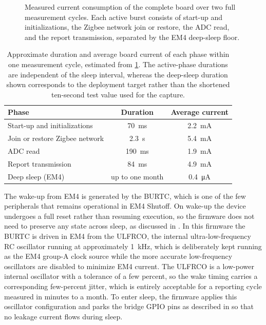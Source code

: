 \begin{figure}
    \centering
    
    \caption{Measured current consumption of the complete board over two full measurement cycles. Each active burst consists of start-up and initializations, the Zigbee network join or restore, the ADC read, and the report transmission, separated by the EM4 deep-sleep floor.}
    \label{fig:Current_2_cycles}
\end{figure}

\begin{table}
\centering
\caption{Approximate duration and average board current of each phase within one measurement cycle, estimated from \cref{fig:Current_2_cycles}. The active-phase durations are independent of the sleep interval, whereas the deep-sleep duration shown corresponds to the deployment target rather than the shortened ten-second test value used for the capture.}
\label{tab:cycle_current}
\begin{tabular}{lcc}
\hline
Phase & Duration & Average current \\
\hline
Start-up and initializations & \SI{70}{\milli\second} & \SI{2.2}{\milli\ampere} \\
Join or restore Zigbee network & \SI{2.3}{\second} & \SI{5.4}{\milli\ampere} \\
ADC read & \SI{190}{\milli\second} & \SI{1.9}{\milli\ampere} \\
Report transmission & \SI{84}{\milli\second} & \SI{4.9}{\milli\ampere} \\
Deep sleep (EM4) & up to one month & \SI{0.4}{\micro\ampere} \\
\hline
\end{tabular}
\end{table}

The wake-up from EM4 is generated by the BURTC, which is one of the few peripherals that remains operational in EM4 Shutoff.
On wake-up the device undergoes a full reset rather than resuming execution, so the firmware does not need to preserve any state across sleep, as discussed in .
In this firmware the BURTC is driven in EM4 from the ULFRCO, the internal ultra-low-frequency RC oscillator running at approximately \SI{1}{\kilo\hertz}, which is deliberately kept running as the EM4 group-A clock source while the more accurate low-frequency oscillators are disabled to minimize EM4 current.
The ULFRCO is a low-power internal oscillator with a tolerance of a few percent, so the wake timing carries a corresponding few-percent jitter, which is entirely acceptable for a reporting cycle measured in minutes to a month.
To enter sleep, the firmware applies this oscillator configuration and parks the bridge GPIO pins as described in  so that no leakage current flows during sleep.

